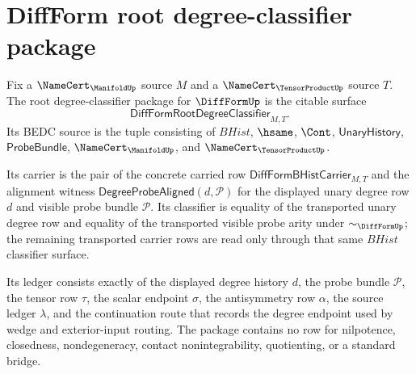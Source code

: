 \section{DiffForm root degree-classifier package}
\label{sec:diffform-root-degree-classifier-package}

\begin{definition}
\label{def:diffform-root-degree-classifier-package}
Fix a $\NameCert_{\ManifoldUp}$ source $M$ and a
$\NameCert_{\TensorProductUp}$ source $T$. The root degree-classifier package
for $\DiffFormUp$ is the citable surface
$$
\mathsf{DiffFormRootDegreeClassifier}_{M,T}.
$$
Its BEDC source is the tuple consisting of $BHist$, $\hsame$, $\Cont$,
$\mathsf{UnaryHistory}$, $\mathsf{ProbeBundle}$,
$\NameCert_{\ManifoldUp}$, and $\NameCert_{\TensorProductUp}$.

Its carrier is the pair of the concrete carried row
$\mathsf{DiffFormBHistCarrier}_{M,T}$ and the alignment witness
$\mathsf{DegreeProbeAligned}(d,\mathcal{P})$ for the displayed unary degree
row $d$ and visible probe bundle $\mathcal{P}$. Its classifier is equality of
the transported unary degree row and equality of the transported visible probe
arity under $\sim_{\DiffFormUp}$; the remaining transported carrier rows are
read only through that same $BHist$ classifier surface.

Its ledger consists exactly of the displayed degree history $d$, the probe
bundle $\mathcal{P}$, the tensor row $\tau$, the scalar endpoint $\sigma$, the
antisymmetry row $\alpha$, the source ledger $\lambda$, and the continuation
route that records the degree endpoint used by wedge and exterior-input
routing. The package contains no row for nilpotence, closedness,
nondegeneracy, contact nonintegrability, quotienting, or a standard bridge.
\end{definition}

